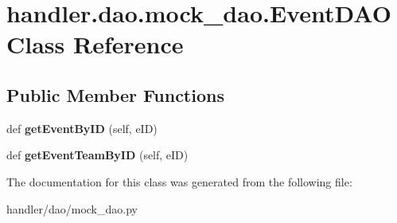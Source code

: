 \hypertarget{classhandler_1_1dao_1_1mock__dao_1_1_event_d_a_o}{}\section{handler.\+dao.\+mock\+\_\+dao.\+Event\+D\+AO Class Reference}
\label{classhandler_1_1dao_1_1mock__dao_1_1_event_d_a_o}
\subsection*{Public Member Functions}
\begin{DoxyCompactItemize}
\item 
\mbox{\label{classhandler_1_1dao_1_1mock__dao_1_1_event_d_a_o_a5c8225a927caedb06ddd63beed79a014}} 
def {\bfseries get\+Event\+By\+ID} (self, e\+ID)
\item 
\mbox{\label{classhandler_1_1dao_1_1mock__dao_1_1_event_d_a_o_abb8a593ea980051f5086396e421846a1}} 
def {\bfseries get\+Event\+Team\+By\+ID} (self, e\+ID)
\end{DoxyCompactItemize}


The documentation for this class was generated from the following file\+:\begin{DoxyCompactItemize}
\item 
handler/dao/mock\+\_\+dao.\+py\end{DoxyCompactItemize}
